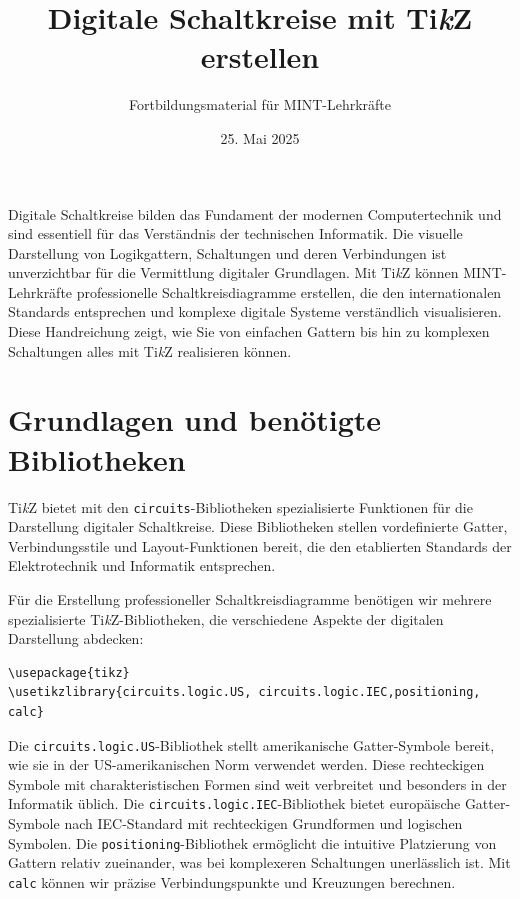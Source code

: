 


\usetikzlibrary{shapes.gates.logic.US}


\title{Digitale Schaltkreise mit Ti\textit{k}Z erstellen}
\author{Fortbildungsmaterial für MINT-Lehrkräfte}
\date{25. Mai 2025}
\pagestyle{plain}



\maketitle

Digitale Schaltkreise bilden das Fundament der modernen Computertechnik und sind essentiell für das Verständnis der technischen Informatik. Die visuelle Darstellung von Logikgattern, Schaltungen und deren Verbindungen ist unverzichtbar für die Vermittlung digitaler Grundlagen. Mit Ti\textit{k}Z können MINT-Lehrkräfte professionelle Schaltkreisdiagramme erstellen, die den internationalen Standards entsprechen und komplexe digitale Systeme verständlich visualisieren. Diese Handreichung zeigt, wie Sie von einfachen Gattern bis hin zu komplexen Schaltungen alles mit Ti\textit{k}Z realisieren können.

\section{Grundlagen und benötigte Bibliotheken}

Ti\textit{k}Z bietet mit den \texttt{circuits}-Bibliotheken spezialisierte Funktionen für die Darstellung digitaler Schaltkreise. Diese Bibliotheken stellen vordefinierte Gatter, Verbindungsstile und Layout-Funktionen bereit, die den etablierten Standards der Elektrotechnik und Informatik entsprechen.

Für die Erstellung professioneller Schaltkreisdiagramme benötigen wir mehrere spezialisierte Ti\textit{k}Z-Bibliotheken, die verschiedene Aspekte der digitalen Darstellung abdecken:

\begin{lstlisting}[style=latex]
\usepackage{tikz}
\usetikzlibrary{circuits.logic.US, circuits.logic.IEC,positioning, calc}
\end{lstlisting}

Die \texttt{circuits.logic.US}-Bibliothek stellt amerikanische Gatter-Symbole bereit, wie sie in der US-amerikanischen Norm verwendet werden. Diese rechteckigen Symbole mit charakteristischen Formen sind weit verbreitet und besonders in der Informatik üblich. Die \texttt{circuits.logic.IEC}-Bibliothek bietet europäische Gatter-Symbole nach IEC-Standard mit rechteckigen Grundformen und logischen Symbolen. Die \texttt{positioning}-Bibliothek ermöglicht die intuitive Platzierung von Gattern relativ zueinander, was bei komplexeren Schaltungen unerlässlich ist. Mit \texttt{calc} können wir präzise Verbindungspunkte und Kreuzungen berechnen.



